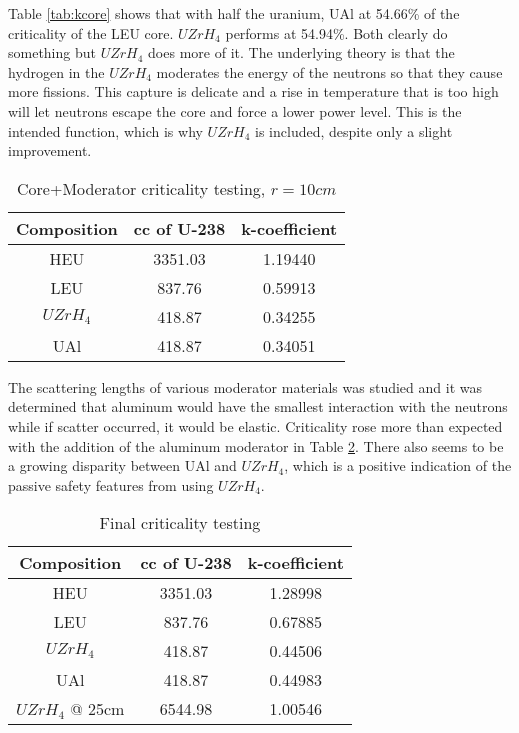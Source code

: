 Table \ref{tab:kcore} shows that with half the uranium, UAl at 54.66\% of the criticality of the LEU core. $UZrH_4$ performs at 54.94\%. Both clearly do something but $UZrH_4$ does more of it. The underlying theory is that the hydrogen in the $UZrH_4$ moderates the energy of the neutrons so that they cause more fissions. This capture is delicate and a rise in temperature that is too high will let neutrons escape the core and force a lower power level. This is the intended function, which is why $UZrH_4$ is included, despite only a slight improvement.

\begin{table}[!htbp]
\centering
\caption{Core+Moderator criticality testing, $r=10cm$}
\label{tab:kmod}
\begin{tabular}{|c|c|c|}
\hline
Composition		& cc of U-238		& k-coefficient \\
\hline
HEU	  	        & 3351.03           & 1.19440       \\
\hline
LEU				&  837.76           & 0.59913       \\
\hline
$UZrH_4$ 		&  418.87           & 0.34255       \\
\hline
UAl 			&  418.87           & 0.34051       \\
\hline
\end{tabular}
\end{table}

The scattering lengths of various moderator materials was studied and it was determined that aluminum would have the smallest interaction with the neutrons while if scatter occurred, it would be elastic. Criticality rose more than expected with the addition of the aluminum moderator in Table \ref{tab:kmod}. There also seems to be a growing disparity between UAl and $UZrH_4$, which is a positive indication of the passive safety features from using $UZrH_4$.

\begin{table}[!htbp]
\centering
\caption{Final criticality testing}
\label{tab:kmod}
\begin{tabular}{|c|c|c|}
\hline
Composition			& cc of U-238		& k-coefficient \\
\hline
HEU	  	        	& 3351.03           & 1.28998       \\
\hline
LEU					&  837.76           & 0.67885       \\
\hline
$UZrH_4$ 			&  418.87           & 0.44506       \\
\hline
UAl 				&  418.87           & 0.44983       \\
\hline
$UZrH_4$ @ 25cm 	& 6544.98           & 1.00546       \\
\hline
\end{tabular}
\end{table}


